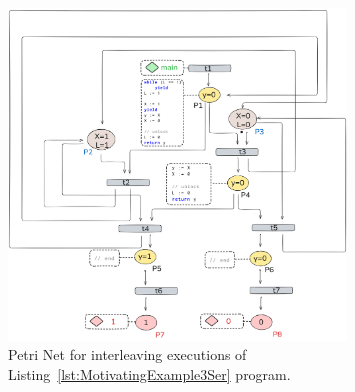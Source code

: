 \begin{figure}[!htbp]
	\centering
	\includegraphics[width=0.8\textwidth]{plots/code_3_PN_with_annotation.png}
	\caption{Petri Net for interleaving executions of Listing~\ref{lst:MotivatingExample3Ser} program.}
	\label{fig:code3ExamplePN}
\end{figure}

\newpage